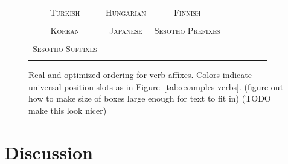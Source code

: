\documentclass[11pt,letterpaper]{article}
\newcommand\mhahn[1]{{\color{red}(#1)}}
\begin{document}
\begin{figure}[]

\begin{tabular}{cccccccc}
\textsc{Turkish} & \textsc{Hungarian} & \textsc{Finnish} \\
\begin{minipage}{.3\textwidth}
  
  \end{minipage}
  &
  \begin{minipage}{.3\textwidth}
  
  \end{minipage}
  &
    \begin{minipage}{.3\textwidth}
  
  \end{minipage}
  \\
  \textsc{Korean}  & \textsc{Japanese} & \textsc{Sesotho Prefixes} \\
      \begin{minipage}{.3\textwidth}
  
  \end{minipage}
  &
  \begin{minipage}{.3\textwidth}
  
  \end{minipage}
  &
  \begin{minipage}{.3\textwidth}
  
  \end{minipage} \\
  \textsc{Sesotho Suffixes} \\
  \begin{minipage}{.3\textwidth}
  
  \end{minipage}
  \end{tabular}
  
  
    \caption{Real and optimized ordering for verb affixes. Colors indicate universal position slots as in Figure~\ref{tab:examples-verbs}.
    \mhahn{figure out how to make size of boxes large enough for text to fit in}%
    \mhahn{TODO make this look nicer}
    }
    \label{fig:real_and_optimized_verbs}
\end{figure}




\section{Discussion}\label{sec:discussion}
\end{document}
